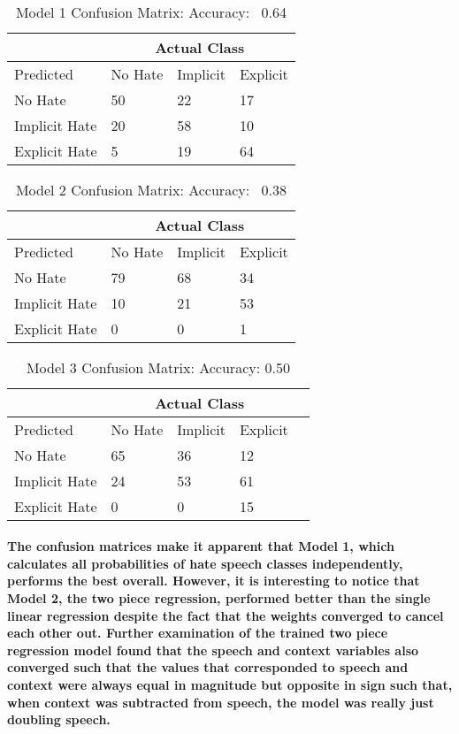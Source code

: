 \documentclass{article}
\begin{document}
\paragraph{}
\begin{table}[H]
\begin{tabular}
{|p{}|p{}|p{}|p{}|}
\hline
&\multicolumn{3}{|c|}{Actual Class}\\
\hline
Predicted&No Hate&Implicit&Explicit\\
\hline
No Hate&50&22&17\\
Implicit Hate&20&58&10\\
Explicit Hate&5&19&64\\
\hline  
\end{tabular}
\caption{Model 1 Confusion Matrix: Accuracy: ~0.64}
\end{table}
\begin{table}[H]
\begin{tabular}
{|p{}|p{}|p{}|p{}|}
\hline
&\multicolumn{3}{|c|}{Actual Class}\\
\hline
Predicted&No Hate&Implicit&Explicit\\
\hline
No Hate&79&68&34\\
Implicit Hate&10&21&53\\
Explicit Hate&0&0&1\\
\hline  
\end{tabular}
\caption{Model 2 Confusion Matrix: Accuracy: ~0.38}
\end{table}
\begin{table}[H]
\begin{tabular}
{|p{}|p{}|p{}|p{}|p{}|}
\hline
&\multicolumn{3}{|c|}{Actual Class}\\
\hline
Predicted&No Hate&Implicit&Explicit\\
\hline
No Hate&65&36&12\\
Implicit Hate&24&53&61\\
Explicit Hate&0&0&15\\
\hline  
\end{tabular}
\caption{Model 3 Confusion Matrix: Accuracy: 0.50}
\end{table}
\paragraph{The confusion matrices make it apparent that Model 1, which calculates all probabilities of hate speech classes independently, performs the best overall. However, it is interesting to notice that Model 2, the two piece regression, performed better than the single linear regression despite the fact that the weights converged to cancel each other out. Further examination of the trained two piece regression model found that the speech and context variables also converged such that the values that corresponded to speech and context were always equal in magnitude but opposite in sign such that, when context was subtracted from speech, the model was really just doubling speech.}
\end{document}

